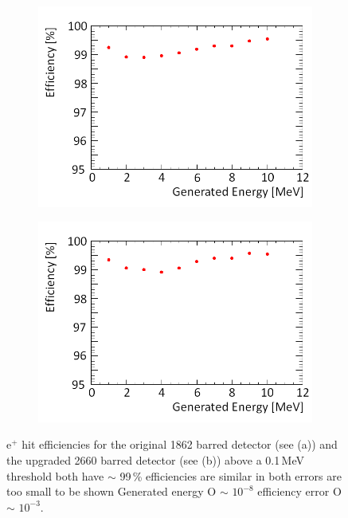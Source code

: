 \begin{figure}[!h]
\centering
\begin{subfigure}{.5\textwidth}
  \centering
  \includegraphics[width=\linewidth]{Chapter4/Figs/Raster/year1Plots/2000_1-10MeV_sec_p_spread_run_medText.png}
  \captionsetup{width=.9\linewidth}
  \caption{}
  \label{subFig:2000_p_sec}
\end{subfigure}%
\begin{subfigure}{.5\textwidth}
  \centering
  \includegraphics[width=\linewidth]{Chapter4/Figs/Raster/year1Plots/3000_1-10MeV_sec_p_spread_run_medText.png}
  \captionsetup{width=.9\linewidth}
  \caption{}
  \label{subFig:3000_p_sec}
\end{subfigure}
\caption{e$^+$ hit efficiencies for the original 1862 barred detector (see (a)) and the upgraded 2660 barred detector (see (b)) above a 0.1\,MeV threshold both have $\sim$ 99\,\% efficiencies are similar in both errors are too small to be shown Generated energy O $\sim$ $10^{-8}$ efficiency error O $\sim$ $10^{-3}$. }
\label{fig:2000_3000_p_secs}
\end{figure}

